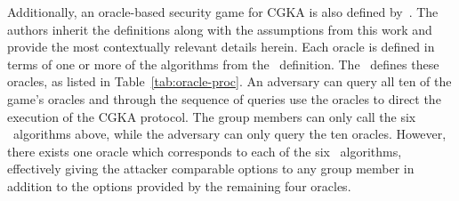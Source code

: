 \documentclass[authordraft,sigconf]{acmart}
\newcommand{\Abrev}[1]{\gls{#1}}
\begin{document}
Additionally, an oracle-based security game for \Abrev{CGKA} is also defined by~\cite{alwen2020security}.
The authors inherit the definitions along with the assumptions from this work and provide the most contextually relevant details herein.
Each oracle is defined in terms of one or more of the algorithms from the \CGKAdef\ definition.
The \CGKAsec\ defines these oracles, as listed in Table~\ref{tab:oracle-proc}. 
An adversary can query all ten of the game's oracles and through the sequence of queries use the oracles to direct the execution of the \Abrev{CGKA} protocol.
The group members can only call the six \CGKAdef\ algorithms above, while the adversary can only query the ten oracles.
However, there exists one oracle which corresponds to each of the six \CGKAdef\ algorithms, effectively giving the attacker comparable options to any group member in addition to the options provided by the remaining four oracles.
\end{document}
